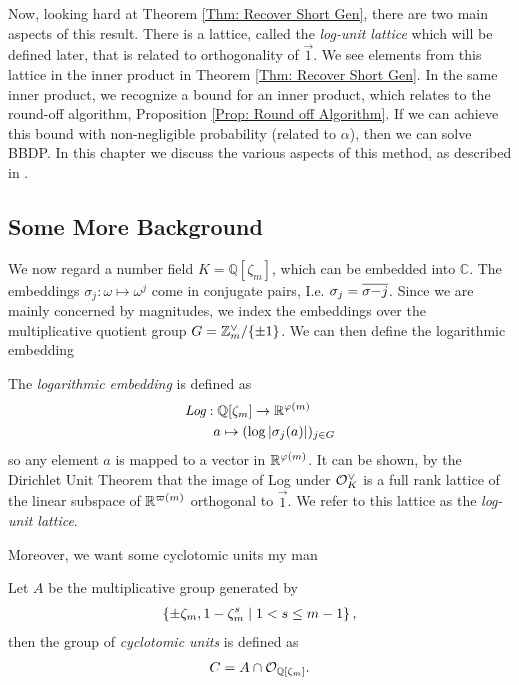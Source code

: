 Now, looking hard at Theorem \ref{Thm: Recover Short Gen}, there are two main aspects of this result. There is a lattice, called the \emph{log-unit lattice} which will be defined later, that is related to orthogonality of \(\vec{1}\). We see elements from this lattice in the inner product in Theorem \ref{Thm: Recover Short Gen}. In the same inner product, we recognize a bound for an inner product, which relates to the round-off algorithm, Proposition \ref{Prop: Round off Algorithm}. If we can achieve this bound with non-negligible probability (related to \(\alpha\)), then we can solve BBDP. In this chapter we discuss the various aspects of this method, as described in \cite{Recover Short Gen}.
\subsection{Some More Background}
We now regard a number field \(K = \mathbb{Q}[\zeta_m]\), which can be embedded into \(\mathbb{C}\). The embeddings \(\sigma_j:\omega\mapsto\omega^j\) come in conjugate pairs, I.e. \(\sigma_j = \overline{\sigma{-j}}\). Since we are mainly concerned by magnitudes, we index the embeddings over the multiplicative quotient group \(G = \mathbb{Z}_m^\vee/\{\pm 1\}\). We can then define the logarithmic embedding
\begin{definition}
The \emph{logarithmic embedding} is defined as
\begin{equation*}
    \begin{split}
        \emph{Log}:&\; \mathbb{Q}[\zeta_m]\rightarrow \mathbb{R}^{\varphi(m)}\\
                   & a\mapsto (\log |\sigma_j(a)|)_{j\in G}
    \end{split}
\end{equation*}
so any element \(a\) is mapped to a vector in \(\mathbb{R}^{\varphi(m)}\).  It can be shown, by the Dirichlet Unit Theorem  that the image of Log under \(\mathcal{O}_K^\vee\) is a full rank lattice of the linear subspace of \(\mathbb{R}^{\varpi(m)}\) orthogonal to \(\vec{1}\). We refer to this lattice as the \emph{log-unit lattice}.
\end{definition}
Moreover, we want some cyclotomic units my man
\begin{definition}
Let \(A\) be the multiplicative group generated by 
\begin{align*}
    \left\{\pm\zeta_m, 1 - \zeta_m^s\;|\; 1<s\leq m - 1  \right\},
\end{align*}
then the group of \emph{cyclotomic units} is defined as
\begin{align*}
    C = A\cap\mathcal{O}_{\mathbb{Q}[\zeta_m]}.
\end{align*}
\end{definition}
